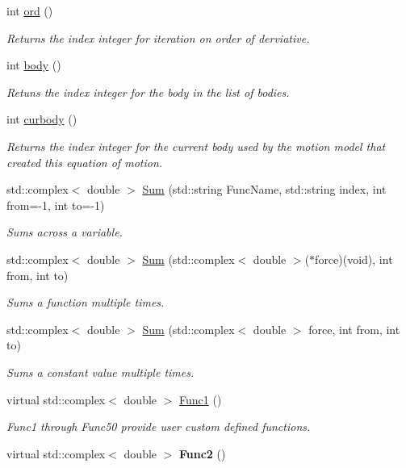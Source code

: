 \begin{DoxyCompactItemize}
int \hyperlink{classosea_1_1ofreq_1_1_equationof_motion_a31f904818ce75c9e2a2b5cff9fc707a5}{ord} ()
\begin{DoxyCompactList}\small\item\em Returns the index integer for iteration on order of derviative. \end{DoxyCompactList}\item 
int \hyperlink{classosea_1_1ofreq_1_1_equationof_motion_ac87fe1d5112f5b42f9afd5f1c3b9002c}{body} ()
\begin{DoxyCompactList}\small\item\em Retuns the index integer for the body in the list of bodies. \end{DoxyCompactList}\item 
int \hyperlink{classosea_1_1ofreq_1_1_equationof_motion_a2fd7f9778dced5bba0d362841cf182a7}{curbody} ()
\begin{DoxyCompactList}\small\item\em Returns the index integer for the current body used by the motion model that created this equation of motion. \end{DoxyCompactList}\item 
std\-::complex$<$ double $>$ \hyperlink{classosea_1_1ofreq_1_1_equationof_motion_a5907d782ee639d5ec24515ed21050851}{Sum} (std\-::string Func\-Name, std\-::string index, int from=-\/1, int to=-\/1)
\begin{DoxyCompactList}\small\item\em Sums across a variable. \end{DoxyCompactList}\item 
std\-::complex$<$ double $>$ \hyperlink{classosea_1_1ofreq_1_1_equationof_motion_ab255de5deaef7394c788bb68a432aec0}{Sum} (std\-::complex$<$ double $>$($\ast$force)(void), int from, int to)
\begin{DoxyCompactList}\small\item\em Sums a function multiple times. \end{DoxyCompactList}\item 
std\-::complex$<$ double $>$ \hyperlink{classosea_1_1ofreq_1_1_equationof_motion_a44797e6d9ebed0de563ac08d15f8035f}{Sum} (std\-::complex$<$ double $>$ force, int from, int to)
\begin{DoxyCompactList}\small\item\em Sums a constant value multiple times. \end{DoxyCompactList}\item 
virtual std\-::complex$<$ double $>$ \hyperlink{classosea_1_1ofreq_1_1_equationof_motion_af83fcd0f9089a49f0b36e1af79b66922}{Func1} ()
\begin{DoxyCompactList}\small\item\em Func1 through Func50 provide user custom defined functions. \end{DoxyCompactList}\item 
\hypertarget{classosea_1_1ofreq_1_1_equationof_motion_accd87271595a2eac0dc116285479ecff}{virtual std\-::complex$<$ double $>$ {\bfseries Func2} ()}\label{classosea_1_1ofreq_1_1_equationof_motion_accd87271595a2eac0dc116285479ecff}


\end{DoxyCompactItemize}
